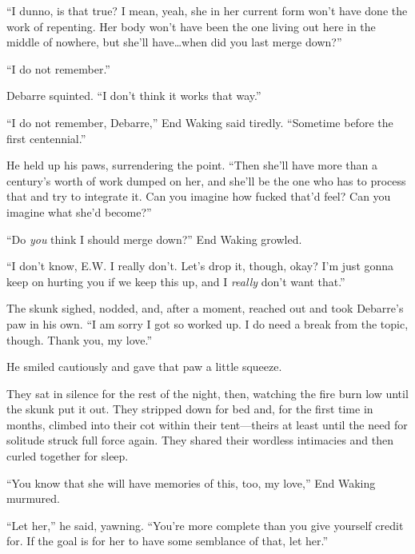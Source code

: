 ``I dunno, is that true? I mean, yeah, she in her current form won't have done the work of repenting. Her body won't have been the one living out here in the middle of nowhere, but she'll have\ldots when did you last merge down?''

``I do not remember.''

Debarre squinted. ``I don't think it works that way.''

``I do not remember, Debarre,'' End Waking said tiredly. ``Sometime before the first centennial.''

He held up his paws, surrendering the point. ``Then she'll have more than a century's worth of work dumped on her, and she'll be the one who has to process that and try to integrate it. Can you imagine how fucked that'd feel? Can you imagine what she'd become?''

``Do \emph{you} think I should merge down?'' End Waking growled.

``I don't know, E.W. I really don't. Let's drop it, though, okay? I'm just gonna keep on hurting you if we keep this up, and I \emph{really} don't want that.''

The skunk sighed, nodded, and, after a moment, reached out and took Debarre's paw in his own. ``I am sorry I got so worked up. I do need a break from the topic, though. Thank you, my love.''

He smiled cautiously and gave that paw a little squeeze.

They sat in silence for the rest of the night, then, watching the fire burn low until the skunk put it out. They stripped down for bed and, for the first time in months, climbed into their cot within their tent—theirs at least until the need for solitude struck full force again. They shared their wordless intimacies and then curled together for sleep.

``You know that she will have memories of this, too, my love,'' End Waking murmured.

``Let her,'' he said, yawning. ``You're more complete than you give yourself credit for. If the goal is for her to have some semblance of that, let her.''

